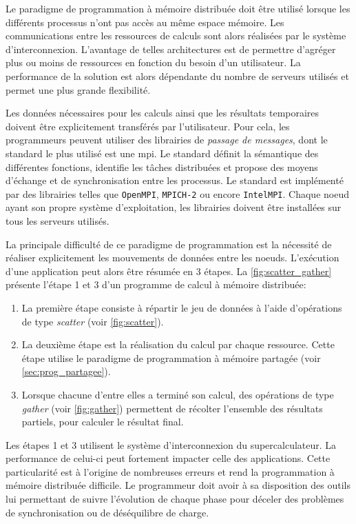            Le paradigme de programmation à mémoire distribuée doit être utilisé lorsque les différents processus n'ont pas accès au même espace mémoire. Les communications entre les ressources de calculs sont alors réalisées par le système d'interconnexion. L'avantage de telles architectures est de permettre d'agréger plus ou moins de ressources en fonction du besoin d'un utilisateur. La performance de la solution est alors dépendante du nombre de serveurs utilisés et permet une plus grande flexibilité. 
            
            Les données nécessaires pour les calculs ainsi que les résultats temporaires doivent être explicitement transférés par l'utilisateur. Pour cela, les programmeurs peuvent utiliser des librairies de \textit{passage de messages}, dont le standard le plus utilisé est une \gls{mpi}. Le standard définit la sémantique des différentes fonctions, identifie les tâches distribuées et propose des moyens d'échange et de synchronisation entre les processus. Le standard est implémenté par des librairies telles que \verb|OpenMPI|, \verb|MPICH-2| ou encore \verb|IntelMPI|. Chaque noeud ayant son propre système d'exploitation, les librairies doivent être installées sur tous les serveurs utilisés. 
        
            La principale difficulté de ce paradigme de programmation est la nécessité de réaliser explicitement les mouvements de données entre les noeuds. L'exécution d'une application peut alors être résumée en 3 étapes. La \autoref{fig:scatter_gather} présente l'étape 1 et 3 d'un programme de calcul à mémoire distribuée:
            \begin{enumerate}
                \item La première étape consiste à répartir le jeu de données à l'aide d'opérations de type \textit{scatter} (voir \autoref{fig:scatter}). 
                \item La deuxième étape est la réalisation du calcul par chaque ressource. Cette étape utilise le paradigme de programmation à mémoire partagée (voir \autoref{sec:prog_partagee}).
                \item Lorsque chacune d'entre elles a terminé son calcul, des opérations de type \textit{gather} (voir \autoref{fig:gather}) permettent de récolter l'ensemble des résultats partiels, pour calculer le résultat final.
            \end{enumerate}
            Les étapes 1 et 3 utilisent le système d'interconnexion du supercalculateur. La performance de celui-ci peut fortement impacter celle des applications. Cette particularité est à l'origine de nombreuses erreurs et rend la programmation à mémoire distribuée difficile. Le programmeur doit avoir à sa disposition des outils lui permettant de suivre l'évolution de chaque phase pour déceler des problèmes de synchronisation ou de déséquilibre de charge.
        
